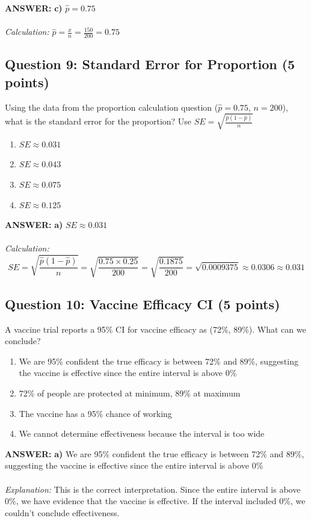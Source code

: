 \documentclass[11pt]{article}
\newcommand{\answer}[1]{\par\vspace{0.3em}\colorbox{green!10}{\parbox{\dimexpr\textwidth-2\fboxsep}{\textbf{ANSWER:} #1}}\vspace{0.3em}\par}
\begin{document}
\answer{\textbf{c)} $\hat{p} = 0.75$ \\ \\
\textit{Calculation:} $\hat{p} = \frac{x}{n} = \frac{150}{200} = 0.75$}

\subsection*{Question 9: Standard Error for Proportion (5 points)}

Using the data from the proportion calculation question ($\hat{p} = 0.75$, $n = 200$), what is the standard error for the proportion? Use $SE = \sqrt{\frac{\hat{p}(1-\hat{p})}{n}}$

\begin{enumerate}[label=\alph*)]
\item $SE \approx 0.031$
\item $SE \approx 0.043$
\item $SE \approx 0.075$
\item $SE \approx 0.125$
\end{enumerate}

\answer{\textbf{a)} $SE \approx 0.031$ \\ \\
\textit{Calculation:}
$$SE = \sqrt{\frac{\hat{p}(1-\hat{p})}{n}} = \sqrt{\frac{0.75 \times 0.25}{200}} = \sqrt{\frac{0.1875}{200}} = \sqrt{0.0009375} \approx 0.0306 \approx 0.031$$}

\subsection*{Question 10: Vaccine Efficacy CI (5 points)}

A vaccine trial reports a 95\% CI for vaccine efficacy as (72\%, 89\%). What can we conclude?

\begin{enumerate}[label=\alph*)]
\item We are 95\% confident the true efficacy is between 72\% and 89\%, suggesting the vaccine is effective since the entire interval is above 0\%
\item 72\% of people are protected at minimum, 89\% at maximum
\item The vaccine has a 95\% chance of working
\item We cannot determine effectiveness because the interval is too wide
\end{enumerate}

\answer{\textbf{a)} We are 95\% confident the true efficacy is between 72\% and 89\%, suggesting the vaccine is effective since the entire interval is above 0\% \\ \\
\textit{Explanation:} This is the correct interpretation. Since the entire interval is above 0\%, we have evidence that the vaccine is effective. If the interval included 0\%, we couldn't conclude effectiveness.}
\end{document}
